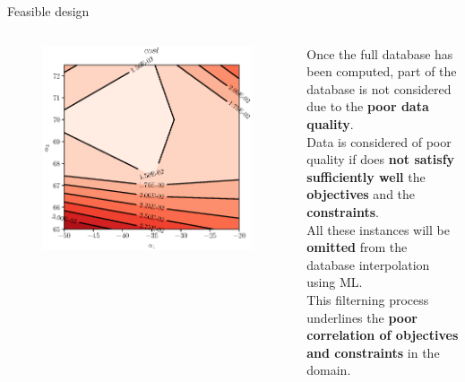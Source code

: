 \begin{frame}{Feasible design}
    \begin{columns}
        \begin{figure}
            \centering
            \includegraphics[scale=0.5]{./images/cost.eps}
        \end{figure}
        Once the full database has been computed, part of the database is not considered due to the \textbf{poor data quality}. 
        \\[0.5cm]
        Data is considered of poor quality if does \textbf{not satisfy sufficiently well} the \textbf{objectives} and the \textbf{constraints}. 
        \\[0.5cm]
        All these instances will be \textbf{omitted} from the database interpolation using ML. 
        \\[0.5cm]
        This filterning process underlines the \textbf{poor correlation of objectives and constraints} in the domain. 
    \end{columns}
\end{frame}